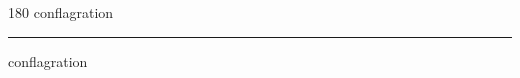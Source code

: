 
\begin{frame}
\begin{center}
\begin{turn}{180}
{\fontsize{2.5cm}{1em}\selectfont conflagration}
\end{turn}
\vspace{1em}\par  
\hrule
\vspace{1em}\par  
{\fontsize{2.5cm}{1em}\selectfont conflagration}
\end{center}
\end{frame}
